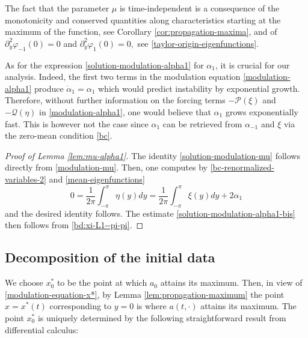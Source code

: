 \documentclass[12pt]{amsart}
\numberwithin{equation}{section}
\numberwithin{equation}{section}
\newcommand{\cpcomment}[1]{\ \newline\textcolor{darkblue}{+++++++++++++++++++++}\newline
\textcolor{darkblue}{#1}\newline\textcolor{darkblue}{+++++++++++++++++++++}\newline
}
\begin{document}
The fact that the parameter $\mu$ is time-independent is a consequence of the monotonicity and conserved quantities along characteristics starting at the maximum of the function, see Corollary \ref{cor:propagation-maxima}, and of $\partial_y^2 \varphi_{-1}(0)=0$ and $\partial_y^2 \varphi_{1}(0)=0,$ %
 see \eqref{taylor-origin-eigenfunctions}.

As for the expression \eqref{solution-modulation-alpha1} for $\alpha_1$, it is crucial for our analysis. Indeed, the first two terms in the modulation equation \eqref{modulation-alpha1} produce $\dot\alpha_{1}=\alpha_1$ which would predict instability by exponential growth. Therefore, without further information on the for\-cing terms $-\mathcal P (\xi)$ and $-\mathcal Q (\eta)$ in \eqref{modulation-alpha1}, one would believe that $\alpha_1$ grows exponentially fast. This is however not the case since $\alpha_{1}$ can be retrieved from $\alpha_{-1}$ and $\xi$ via the zero-mean condition \eqref{bc}.

\begin{proof}[Proof of Lemma \ref{lem:mu-alpha1}]

The identity \eqref{solution-modulation-mu} follows directly from \eqref{modulation-mu}. Then, one computes by \eqref{bc-renormalized-variables-2} and \eqref{mean-eigenfunctions}
$$
0=\frac{1}{2\pi} \int_{-\pi}^\pi \eta(y)dy=\frac{1}{2\pi} \int_{-\pi}^\pi \xi(y)dy+2\alpha_1
$$
and the desired identity follows. The estimate \eqref{solution-modulation-alpha1-bis} then follows from \eqref{bd:xi-L1--pi-pi}.
\end{proof}



 \subsection{Decomposition of the initial data}
 
 We choose $x_0^*$ to be the point at which $a_0$ attains its maximum. Then, in view of \eqref{modulation-equation-x*}, by Lemma \ref{lem:propagation-maximum} the point $x=x^*(t)$ %
  corresponding to $y=0$ is where $a(t,\cdot)$ attains its maximum. The point $x_0^*$ is uniquely determined by the following straightforward result from differential calculus:
\end{document}
